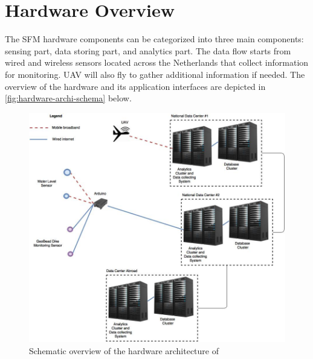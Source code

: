 \section{Hardware Overview}
\label{sec:hardware-overview}
The SFM hardware components can be categorized into three main components: sensing part, data storing part, and analytics part. The data flow starts from wired and wireless sensors located across the Netherlands that collect information for monitoring. UAV will also fly to gather additional information if needed. The overview of the hardware and its application interfaces are depicted in \autoref{fig:hardware-archi-schema} below.

\begin{figure}[H]
	\centering
	\includegraphics[scale=0.4]{6-hardware/images/hardwareoverview.jpg}
	\caption{Schematic overview of the hardware architecture of \ProjectName{}}
	\label{fig:hardware-archi-schema}
\end{figure}


